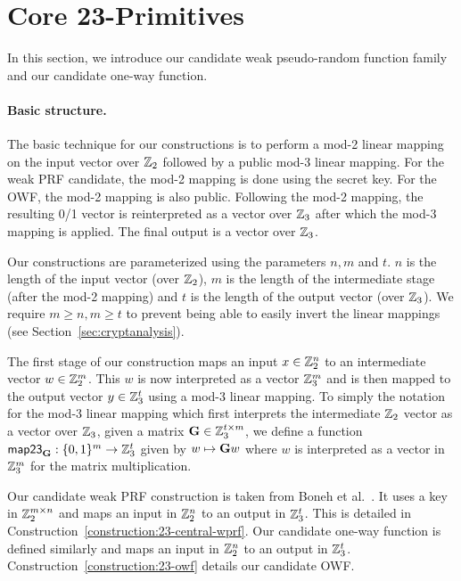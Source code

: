 
\newpage

\section{Core 23-Primitives}
\noindent {}

\noindent In this section, we introduce our candidate weak pseudo-random function family and our candidate one-way function. 

\paragraph{Basic structure.}
The basic technique for our constructions is to perform a mod-2 linear mapping on the input vector over $\mathbb{Z}_2$ followed by a public mod-3 linear mapping. For the weak PRF candidate, the mod-2 mapping is done using the secret key. For the OWF, the mod-2 mapping is also public. Following the mod-2 mapping, the resulting 0/1 vector is reinterpreted as a vector over $\mathbb{Z}_3$ after which the mod-3 mapping is applied. The final output is a vector over $\mathbb{Z}_3$.

Our constructions are parameterized using the parameters $n, m$ and $t$. $n$ is the length of the input vector (over $\mathbb{Z}_2$), $m$ is the length of the intermediate stage (after the mod-2 mapping) and $t$ is the length of the output vector (over $\mathbb{Z}_3$). We require $m \geq n, m \geq t$ to prevent being able to easily invert the linear mappings (see Section~\ref{sec:cryptanalysis}). 

The first stage of our construction maps an input $x \in \mathbb{Z}_2^n$ to an intermediate vector $w \in \mathbb{Z}_2^m$. This $w$ is now interpreted as a vector $\mathbb{Z}_3^m$ and is then mapped to the output vector $y \in \mathbb{Z}_3^t$ using a mod-3 linear mapping. To simply the notation for the mod-3 linear mapping which first interprets the intermediate $\mathbb{Z}_2$ vector as a vector over $\mathbb{Z}_3$, given a matrix $\mat{G} \in \Z_3^{t \times m}$, we define a function $\map{\mat{G}}: \bits^m \to \Z_3^t$ given by $w \mapsto \mat{G}w$ where $w$ is interpreted as a vector in $\mathbb{Z}_3^m$ for the matrix multiplication.

Our candidate weak PRF construction is taken from Boneh et al.~\cite{boneh2018-darkmatter}. It uses a key in $\mathbb{Z}_2^{m \times n}$ and maps an input in $\mathbb{Z}_2^n$ to an output in $\mathbb{Z}_3^t$. This is detailed in Construction~\ref{construction:23-central-wprf}. Our candidate one-way function is defined similarly and maps an input in $\mathbb{Z}_2^n$ to an output in $\mathbb{Z}_3^t$. Construction~\ref{construction:23-owf} details our candidate OWF.

